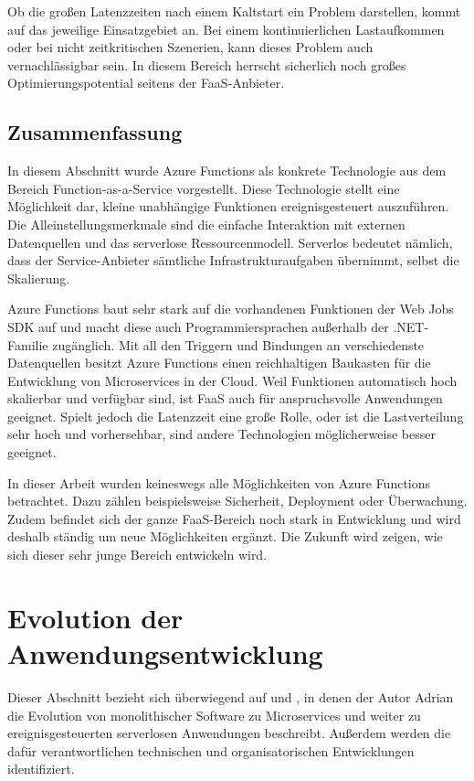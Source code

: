 Ob die großen Latenzzeiten nach einem Kaltstart ein Problem darstellen, kommt auf das jeweilige Einsatzgebiet an. Bei einem kontinuierlichen Lastaufkommen oder bei nicht zeitkritischen Szenerien, kann dieses Problem auch vernachlässigbar sein. In diesem Bereich herrscht sicherlich noch großes Optimierungspotential seitens der FaaS-Anbieter.

\subsection{Zusammenfassung}

In diesem Abschnitt wurde Azure Functions als konkrete Technologie aus dem Bereich Function-as-a-Service vorgestellt. Diese Technologie stellt eine Möglichkeit dar, kleine unabhängige Funktionen ereignisgesteuert auszuführen. Die Alleinstellungsmerkmale sind die einfache Interaktion mit externen Datenquellen und das serverlose Ressourcenmodell. Serverlos bedeutet nämlich, dass der Service-Anbieter sämtliche Infrastrukturaufgaben übernimmt, selbst die Skalierung.

Azure Functions baut sehr stark auf die vorhandenen Funktionen der Web Jobs SDK auf und macht diese auch Programmiersprachen außerhalb der .NET-Familie zugänglich. Mit all den Triggern und Bindungen an verschiedenste Datenquellen besitzt Azure Functions einen reichhaltigen Baukasten für die Entwicklung von Microservices in der Cloud. Weil Funktionen automatisch hoch skalierbar und verfügbar sind, ist FaaS auch für anspruchsvolle Anwendungen geeignet. Spielt jedoch die Latenzzeit eine große Rolle, oder ist die Lastverteilung sehr hoch und vorhersehbar, sind andere Technologien möglicherweise besser geeignet.

In dieser Arbeit wurden keineswegs alle Möglichkeiten von Azure Functions betrachtet. Dazu zählen beispielsweise Sicherheit, Deployment oder Überwachung. Zudem befindet sich der ganze FaaS-Bereich noch stark in Entwicklung und wird deshalb ständig um neue Möglichkeiten ergänzt. Die Zukunft wird zeigen, wie sich dieser sehr junge Bereich entwickeln wird.

\section{Evolution der Anwendungsentwicklung}

Dieser Abschnitt bezieht sich überwiegend auf \cite{Cock16EvoFunc} und \cite{Cock17ShrinkingMS}, in denen der Autor Adrian \citeauthor{Cock16EvoFunc} die Evolution von monolithischer Software zu Microservices und weiter zu ereignisgesteuerten serverlosen Anwendungen beschreibt. Außerdem werden die dafür verantwortlichen technischen und organisatorischen Entwicklungen identifiziert.

